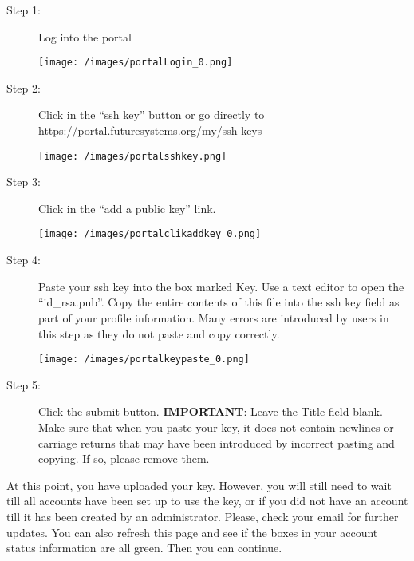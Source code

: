 \begin{description}

\item[Step 1:] Log into the portal \medskip

\begin{center}
\texttt{[image: /images/portalLogin\_0.png]}
\end{center}

\item[Step 2:] Click in the ``ssh key'' button or go directly to
  \url{https://portal.futuresystems.org/my/ssh-keys} \medskip

\begin{center}
\texttt{[image: /images/portalsshkey.png]}
\end{center}

\item[Step 3:] Click in the ``add a public key'' link.  \medskip

\begin{center}
\texttt{[image: /images/portalclikaddkey\_0.png]}
\end{center}

\item[Step 4:] Paste your ssh key into the box marked Key. Use a text
  editor to open the ``id\_rsa.pub''. Copy the entire contents of this
  file into the ssh key field as part of your profile
  information. Many errors are introduced by users in this step as
  they do not paste and copy correctly.  \medskip

\begin{center}
\texttt{[image: /images/portalkeypaste\_0.png]}
\end{center}

\item[Step 5:] Click the submit button. \textbf{IMPORTANT}: Leave the
  Title field blank.  Make sure that when you paste your key, it does
  not contain newlines or carriage returns that may have been
  introduced by incorrect pasting and copying. If so, please remove
  them.

\end{description}

At this point, you have uploaded your key. However, you will still need
to wait till all accounts have been set up to use the key, or if you did
not have an account till it has been created by an administrator.
Please, check your email for further updates. You can also refresh this
page and see if the boxes in your account status information are all
green. Then you can continue.

